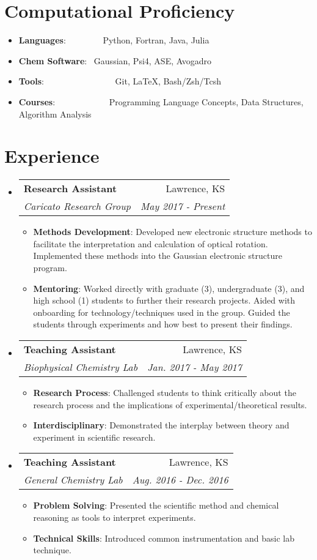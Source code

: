 \documentclass[a4paper,20pt]{article}
\makeatletter
\newcommand{\resumeItem}[2]{
  \item\small{
    \textbf{#1}{: #2 \vspace{-2pt}}
  }
}
\newcommand{\resumeSubheading}[4]{
  \vspace{-1pt}
    \item
    \begin{tabular*}{0.97\textwidth}{l@{\extracolsep{\fill}}r}
      \textbf{#1} & #2 \\
      \textit{#3} & \textit{#4} \\
    \end{tabular*}\vspace{-5pt}
}
\newcommand{\resumeSubItem}[2]{\resumeItem{#1}{#2}\vspace{-3pt}}
\newcommand{\resumeSubHeadingListStart}{\begin{itemize}[leftmargin=*]}
\newcommand{\resumeSubHeadingListEnd}{\end{itemize}}
\newcommand{\resumeItemListStart}{\begin{itemize}}
\newcommand{\resumeItemListEnd}{\end{itemize}\vspace{-5pt}}
\makeatother
\begin{document}
\vspace{-5pt}
\section{Computational Proficiency}
	\resumeSubHeadingListStart
	\resumeSubItem{Languages}{~~~~~~~~Python, Fortran, Java, Julia}
	\resumeSubItem{Chem Software}{~Gaussian, Psi4, ASE, Avogadro}
	\resumeSubItem{Tools}{~~~~~~~~~~~~~~~~Git, LaTeX, Bash/Zsh/Tcsh}
	\resumeSubItem{Courses}{~~~~~~~~~~~~Programming Language Concepts, Data Structures, Algorithm Analysis}
    \resumeSubHeadingListEnd
    
\vspace{-5pt}
\section{Experience}
  \resumeSubHeadingListStart
    \resumeSubheading{Research Assistant}{Lawrence, KS}
    {Caricato Research Group}{May 2017 - Present}
    \resumeItemListStart
        \resumeItem{Methods Development}
          {Developed new electronic structure methods to facilitate the interpretation and calculation of optical rotation. Implemented these methods into the Gaussian electronic structure program.}
          \resumeItem{Mentoring}
          {Worked directly with graduate (3), undergraduate (3), and high school (1) students to further their research projects. Aided with onboarding for technology/techniques used in the group. Guided the students through experiments and how best to present their findings.}
      \resumeItemListEnd
    \resumeSubheading
		{Teaching Assistant}{Lawrence, KS}
		{Biophysical Chemistry Lab}{Jan. 2017 - May 2017}
		\resumeItemListStart
        \resumeItem{Research Process}
          {Challenged students to think critically about the research process and the implications of experimental/theoretical results.}
        \resumeItem{Interdisciplinary}
          {Demonstrated the interplay between theory and experiment in scientific research.}
		\resumeItemListEnd

    \resumeSubheading
		{Teaching Assistant}{Lawrence, KS}
		{General Chemistry Lab}{Aug. 2016 - Dec. 2016}
		\resumeItemListStart
        \resumeItem{Problem Solving}
          {Presented the scientific method and chemical reasoning as tools to interpret experiments.}
        \resumeItem{Technical Skills}
          {Introduced common instrumentation and basic lab technique.}
		\resumeItemListEnd
\resumeSubHeadingListEnd


\vspace{-5pt}
\end{document}
